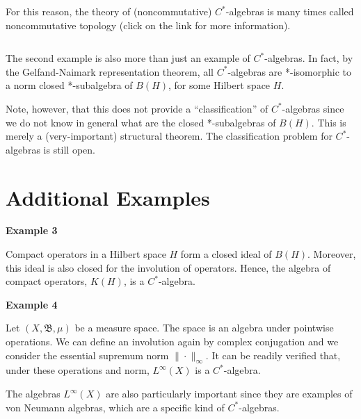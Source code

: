 \documentclass[12pt]{article}
\theoremstyle{inlinedefn}
\theoremstyle{break}
\begin{document}
For this reason, the theory of (noncommutative) $C^*$-algebras is many times called noncommutative topology (click on the link for more information).

$\,$

The second example is also more than just an example of $C^*$-algebras. In fact, by the Gelfand-Naimark representation theorem, all $C^*$-algebras are *-isomorphic to a norm closed *-subalgebra of $B(H)$, for some Hilbert space $H$.

Note, however, that this does not provide a ``classification'' of $C^*$-algebras since we do not know in general what are the closed *-subalgebras of $B(H)$. This is merely a (very-important) structural theorem. The classification problem for $C^*$-algebras is still open.

\section{Additional Examples}

{\bf Example 3}

Compact operators in a Hilbert space $H$ form a closed ideal of $B(H)$. Moreover, this ideal is also closed for the involution of operators. Hence, the algebra of compact operators, $K(H)$, is a $C^*$-algebra.

{\bf Example 4}

Let $(X, \mathfrak{B}, \mu)$ be a measure space. The space  is an algebra under pointwise operations. We can define an involution again by complex conjugation and we consider the essential supremum norm $\| \cdot \|_{\infty}$. It can be readily verified that, under these operations and norm, $L^{\infty}(X)$ is a $C^*$-algebra.

The algebras $L^{\infty}(X)$ are also particularly important since they are examples of von Neumann algebras, which are a specific kind of $C^*$-algebras.





\end{document}
